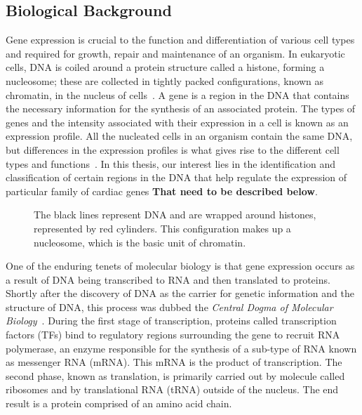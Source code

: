         \subsection{Biological Background}
        Gene expression is crucial to the function and differentiation of various cell types and required for growth, repair and maintenance of an organism.  In eukaryotic cells, DNA is coiled around a protein structure called a histone, forming a nucleosome; these are collected in tightly packed configurations, known as chromatin, in the nucleus of cells~\cite{alberts2002chromosomal, kornberg1974chromatin}. A gene is a region in the DNA that contains the necessary information for the synthesis of an associated protein. The types of genes and the intensity associated with their expression in a cell is known as an expression profile. All the nucleated cells in an organism contain the same DNA, but differences in the expression profiles is what gives rise to the different cell types and functions~\cite{lockhart2000genomics}. In this thesis, our interest lies in the identification and classification of certain regions in the DNA that help regulate the expression of particular family of cardiac genes \textbf{That need to be described below}. 

        
            \begin{figure}[h]
                \centering
                    
                \caption{The black lines represent DNA and are wrapped around histones, represented by red cylinders. This configuration makes up a nucleosome, which is the basic unit of chromatin.}
                \label{fig:chromatin1}
            \end{figure}
            

        
        
        One of the enduring tenets of molecular biology is that gene expression occurs as a result of DNA being transcribed to RNA and then translated to proteins. Shortly after the discovery of DNA as the carrier for genetic information and the structure of DNA, this process was dubbed the \emph{Central Dogma of Molecular Biology}~\cite{crick1958protein, macleod1944studies, watson1953structure}. During the first stage of transcription, proteins called transcription factors (TFs) bind to regulatory regions surrounding the gene to recruit RNA polymerase, an enzyme responsible for the synthesis of a sub-type of RNA known as messenger RNA (mRNA). This mRNA is the product of transcription. The second phase, known as translation, is primarily carried out by molecule called ribosomes and by translational RNA (tRNA) outside of the nucleus. The end result is a protein comprised of an amino acid chain.
        
